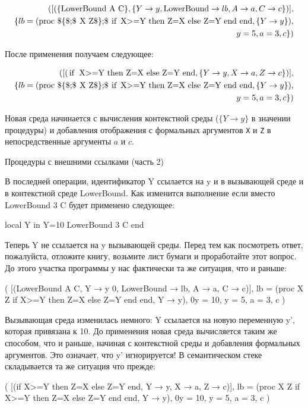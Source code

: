 \begin{eqnarray*}
([(\text{\lstinline|\{LowerBound A C\}|}, \{Y \to y, \text{\lstinline|LowerBound|} \to lb, A \to a, C \to c\})], \\ \{lb = (\text{\lstinline|proc $\{\$\;$ X Z$\}\;$ if X>=Y then Z=X else Z=Y end end|}, \{Y \to y\}), \\ y = 5, a = 3, c\})
\end{eqnarray*}

После применения получаем следующее:

\begin{eqnarray*}
([(\text{\lstinline|if X>=Y then Z=X else Z=Y end|}, \{Y \to y, X \to a, Z \to c\})], \\ \{lb = (\text{\lstinline|proc $\{\$\;$ X Z$\}\;$ if X>=Y then Z=X else Z=Y end end|}, \{Y \to y\}), \\ y = 5, a = 3, c\})
\end{eqnarray*}

Новая среда начинается с вычисления контекстной среды ($\{Y \to y\}$ в значении процедуры) и добавления отображения с формальных аргументов \lstinline|X| и \lstinline|Z| в непосредственные аргументы $a$ и $c$.

Процедуры с внешними ссылками (часть 2)

В последней операции, идентификатор Y ссылается на y и в вызывающей среде и в контекстной среде LowerBound. Как изменится выполнение если вместо {LowerBound 3 C} будет применено следующее:

local Y in
Y=10
{LowerBound 3 C}
end

Теперь Y не ссылается на y вызывающей среды. Перед тем как посмотреть ответ, пожалуйста, отложите книгу, возьмите лист бумаги и проработайте этот вопрос. До этого участка программы у нас фактически та же ситуация, что и раньше:

( [({LowerBound A C}, {Y → y 0, LowerBound → lb, A → a, C → c})],
{ lb = (proc { X Z} if X>=Y then Z=X else Z=Y end end, {Y → y}),
0y = 10, y = 5, a = 3, c} )

Вызывающая среда изменилась немного: Y ссылается на новую переменную y', которая привязана к 10. До применения новая среда вычисляется таким же способом, что и раньше, начиная с контекстной среды и добавления формальных аргументов. Это означает, что y' игнорируется! В семантическом стеке складывается та же ситуация что прежде:

( [(if X>=Y then Z=X else Z=Y end, {Y → y, X → a, Z → c})],
{ lb = (proc { X Z} if X>=Y then Z=X else Z=Y end end, {Y → y}),
0y = 10, y = 5, a = 3, c} )


